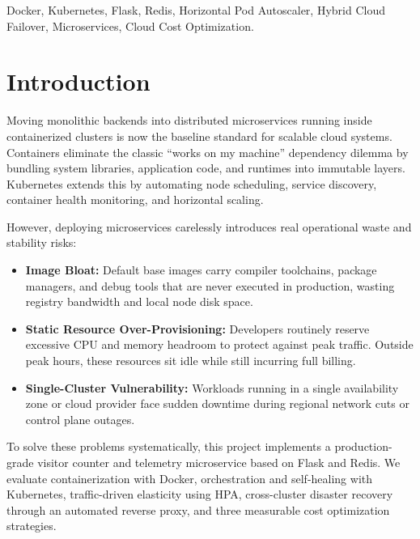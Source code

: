 \documentclass[conference]{IEEEtran}
\begin{document}
\begin{IEEEkeywords}
Docker, Kubernetes, Flask, Redis, Horizontal Pod Autoscaler, Hybrid Cloud Failover, Microservices, Cloud Cost Optimization.
\end{IEEEkeywords}

\section{Introduction}

Moving monolithic backends into distributed microservices running inside containerized clusters is now the baseline standard for scalable cloud systems. Containers eliminate the classic ``works on my machine'' dependency dilemma by bundling system libraries, application code, and runtimes into immutable layers. Kubernetes extends this by automating node scheduling, service discovery, container health monitoring, and horizontal scaling.

However, deploying microservices carelessly introduces real operational waste and stability risks:
\begin{itemize}
    \item \textbf{Image Bloat:} Default base images carry compiler toolchains, package managers, and debug tools that are never executed in production, wasting registry bandwidth and local node disk space.
    \item \textbf{Static Resource Over-Provisioning:} Developers routinely reserve excessive CPU and memory headroom to protect against peak traffic. Outside peak hours, these resources sit idle while still incurring full billing.
    \item \textbf{Single-Cluster Vulnerability:} Workloads running in a single availability zone or cloud provider face sudden downtime during regional network cuts or control plane outages.
\end{itemize}

To solve these problems systematically, this project implements a production-grade visitor counter and telemetry microservice based on Flask and Redis. We evaluate containerization with Docker, orchestration and self-healing with Kubernetes, traffic-driven elasticity using HPA, cross-cluster disaster recovery through an automated reverse proxy, and three measurable cost optimization strategies.

\end{document}
